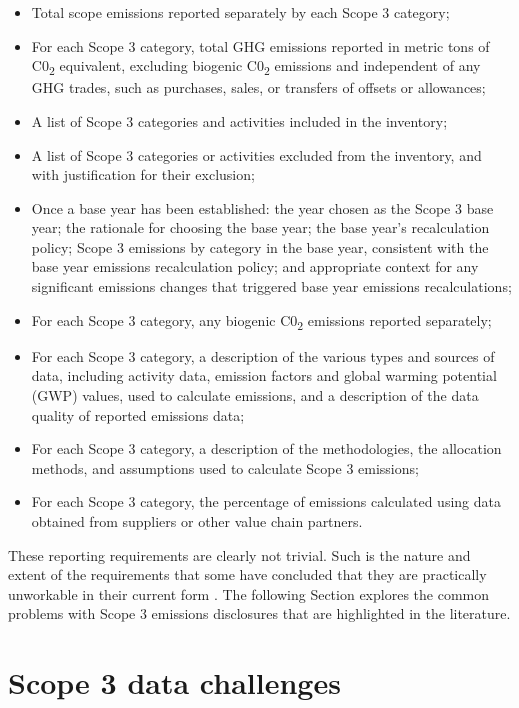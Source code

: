 \documentclass[12pt,twoside]{report}
\begin{document}
\begin{itemize}
	\item Total scope emissions reported separately by each Scope 3 category;
	\item For each Scope 3 category, total GHG emissions reported in metric tons of C0\textsubscript{2} equivalent, excluding biogenic C0\textsubscript{2} emissions and independent of any GHG trades, such as purchases, sales, or transfers of offsets or allowances;
	\item A list of Scope 3 categories and activities included in the inventory;
	\item A list of Scope 3 categories or activities excluded from the inventory, and with justification for their exclusion;
	\item Once a base year has been established: the year chosen as the Scope 3 base year; the rationale for choosing the base year; the base year's recalculation policy; Scope 3 emissions by category in the base year, consistent with the base year emissions recalculation policy; and appropriate context for any significant emissions changes that triggered base year emissions recalculations;
	\item For each Scope 3 category, any biogenic C0\textsubscript{2} emissions reported separately; 
	\item For each Scope 3 category, a description of the various types and sources of data, including activity data, emission factors and global warming potential (GWP) values, used to calculate emissions, and a description of the data quality of reported emissions data;
	\item For each Scope 3 category, a description of the methodologies, the allocation methods, and assumptions used to calculate Scope 3 emissions;
	\item For each Scope 3 category, the percentage of emissions calculated using data obtained from suppliers or other value chain partners.
\end{itemize}
These reporting requirements are clearly not trivial. Such is the nature and extent of the requirements that some have concluded that they are practically unworkable in their current form \cite{patchell2018}. The following Section explores the common problems with Scope 3 emissions disclosures that are highlighted in the literature.

\section{Scope 3 data challenges}\label{sec:Scope3Challenges}
\end{document}
